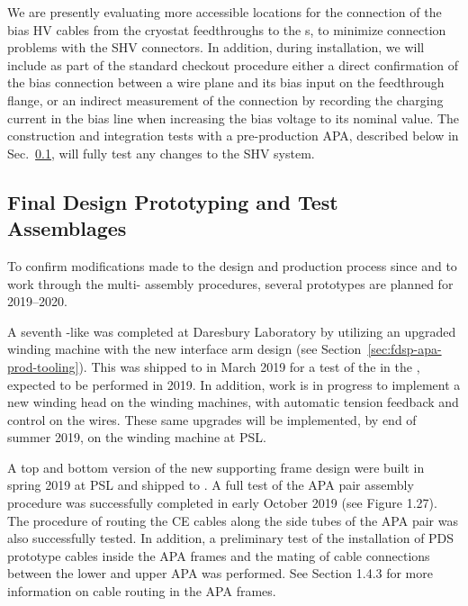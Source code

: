 We are presently evaluating more accessible locations for the connection of the bias HV cables from the cryostat feedthroughs to the s, to minimize connection problems with the SHV connectors. In addition, during installation, we will include as part of the standard checkout procedure either a direct confirmation of the bias connection between a wire plane and its bias input on the feedthrough flange, or an indirect measurement of the connection by recording the charging current in the bias line when increasing the bias voltage to its nominal value.  The construction and integration tests with a pre-production APA, described below in Sec.~\ref{sec:fdsp-apa-qa-prototyping}, will fully test any changes to the SHV system. 


\subsection{Final Design Prototyping and Test Assemblages}
\label{sec:fdsp-apa-qa-prototyping}


To confirm modifications made to the  design and production process since  and to work through the multi- assembly procedures, several prototypes are planned for 2019--2020.

A seventh -like  was completed at Daresbury Laboratory by utilizing an upgraded winding machine with the new interface arm design (see Section~\ref{sec:fdsp-apa-prod-tooling}). This  was shipped to  in March 2019 for a test of the  in the \coldbox, expected to be performed in 2019. In addition, work is in progress to implement a new winding head on the  winding machines, with automatic tension feedback and control on the wires. These same upgrades will be implemented, by end of summer 2019, on the winding machine at PSL. %

A top and bottom version of the new supporting  frame design were built in spring 2019 at PSL and shipped to .  A full test of the APA pair assembly procedure was successfully completed in early October 2019 (see Figure 1.27). The procedure of routing the CE cables along the side tubes of the APA pair was also successfully tested. In addition, a preliminary test of the installation of PDS prototype cables inside the APA frames and the mating of cable connections between the lower and upper APA was performed.  See Section 1.4.3 for more information on cable routing in the APA frames. 


